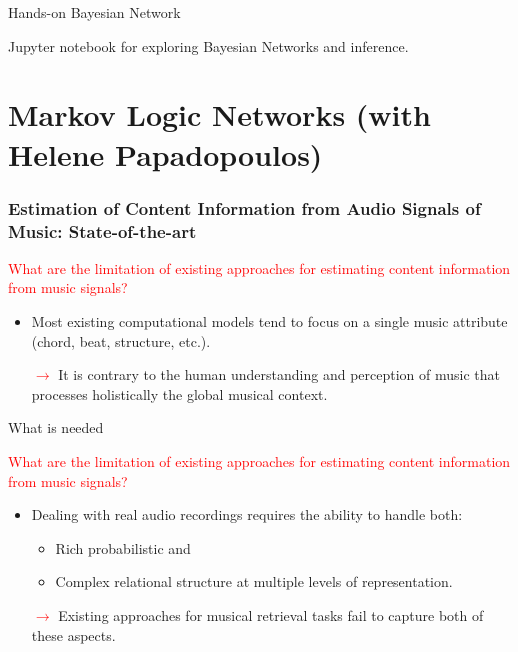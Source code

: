 \documentclass[12pt]{beamer}
\begin{document}
\begin{frame}{Hands-on Bayesian Network}

  Jupyter notebook for exploring Bayesian Networks and inference. 
  \end{frame} 



\section{Markov Logic Networks (with Helene Papadopoulos)} 
\begin{frame}
\frametitle{Estimation of Content Information from Audio Signals of Music: State-of-the-art}

\textcolor{red}{What are the limitation of existing approaches for estimating content information from music signals?}
\bigskip

\begin{itemize}

\item Most existing computational models tend to focus on a single music attribute (chord, beat, structure, etc.).
\smallskip

\textcolor{red}{$\rightarrow$} It is contrary to the human understanding and perception of music that processes holistically the global musical context.%
\bigskip

\end{itemize} 
\end{frame}

\begin{frame}{What is needed} 

\textcolor{red}{What are the limitation of existing approaches for estimating content information from music signals?}
\bigskip
\begin{itemize} 
\item Dealing with real audio recordings requires the ability to handle both:
\smallskip

\begin{itemize}
	\item Rich probabilistic and 
	\item Complex relational structure at multiple levels of representation. 
\end{itemize}
\smallskip
\textcolor{red}{$\rightarrow$} Existing approaches for musical retrieval tasks fail to capture both of these aspects.

\end{itemize}
\end{frame}
\end{document}
